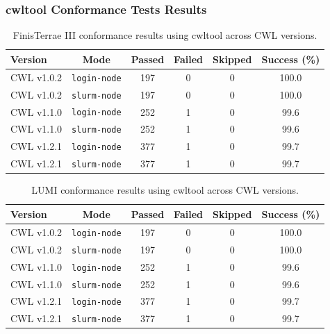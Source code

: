 \documentclass{article}
\begin{document}


\clearpage
\subsubsection*{cwltool Conformance Tests Results}
\begin{table}[ht!]
\centering
\renewcommand{\arraystretch}{1.2}
\setlength{\tabcolsep}{6pt}
\begin{tabular}{|l|c|c|c|c|c|}
\hline
\rowcolor{lightgray!50}
\textbf{Version} & \textbf{Mode} & \textbf{Passed} & \textbf{Failed} & \textbf{Skipped} & \textbf{Success (\%)} \\
\hline
CWL v1.0.2 & \texttt{login-node} & 197 & 0 & 0 & 100.0 \\ \hline
CWL v1.0.2 & \texttt{slurm-node} & 197 & 0 & 0 & 100.0 \\ \hline
\hline
CWL v1.1.0 & \texttt{login-node} & 252 & 1 & 0 & 99.6 \\ \hline
CWL v1.1.0 & \texttt{slurm-node} & 252 & 1 & 0 & 99.6 \\ \hline
\hline
CWL v1.2.1 & \texttt{login-node} & 377 & 1 & 0 & 99.7 \\ \hline
CWL v1.2.1 & \texttt{slurm-node} & 377 & 1 & 0 & 99.7 \\ \hline
\hline
\end{tabular}
\caption{FinisTerrae III conformance results using cwltool across CWL versions.}
\end{table}

\begin{table}[ht!]
\centering
\renewcommand{\arraystretch}{1.2}
\setlength{\tabcolsep}{6pt}
\begin{tabular}{|l|c|c|c|c|c|}
\hline
\rowcolor{lightgray!50}
\textbf{Version} & \textbf{Mode} & \textbf{Passed} & \textbf{Failed} & \textbf{Skipped} & \textbf{Success (\%)} \\
\hline
CWL v1.0.2 & \texttt{login-node} & 197 & 0 & 0 & 100.0 \\ \hline
CWL v1.0.2 & \texttt{slurm-node} & 197 & 0 & 0 & 100.0 \\ \hline
\hline
CWL v1.1.0 & \texttt{login-node} & 252 & 1 & 0 & 99.6 \\ \hline
CWL v1.1.0 & \texttt{slurm-node} & 252 & 1 & 0 & 99.6 \\ \hline
\hline
CWL v1.2.1 & \texttt{login-node} & 377 & 1 & 0 & 99.7 \\ \hline
CWL v1.2.1 & \texttt{slurm-node} & 377 & 1 & 0 & 99.7 \\ \hline
\hline
\end{tabular}
\caption{LUMI conformance results using cwltool across CWL versions.}
\end{table}
\end{document}
